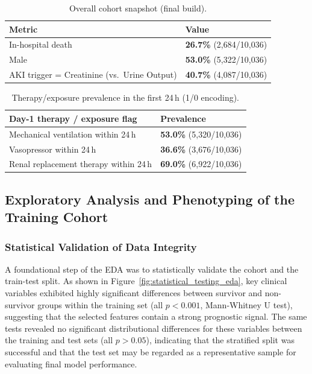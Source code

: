 \begin{table}[htb!]
    \centering
    \caption{Overall cohort snapshot (final build).}
    \label{tab:snapshot}
    \small
    \begin{tabular}{ll}
        \toprule
        \textbf{Metric} & \textbf{Value}\\
        \midrule
        In-hospital death & \textbf{26.7\%} (2,684/10,036)\\
        Male & \textbf{53.0\%} (5,322/10,036)\\
        AKI trigger = Creatinine (vs.\ Urine Output) & \textbf{40.7\%} (4,087/10,036)\\
        \bottomrule
    \end{tabular}
\end{table}

\begin{table}[htb!]
    \centering
    \caption{Therapy/exposure prevalence in the first 24\,h (1/0 encoding).}
    \label{tab:therapies-prev}
    \small
    \begin{tabular}{ll}
        \toprule
        \textbf{Day-1 therapy / exposure flag} & \textbf{Prevalence} \\
        \midrule
        Mechanical ventilation within 24\,h & \textbf{53.0\%} (5,320/10,036) \\
        Vasopressor within 24\,h & \textbf{36.6\%} (3,676/10,036) \\
        Renal replacement therapy within 24\,h & \textbf{69.0\%} (6,922/10,036) \\
        \bottomrule
    \end{tabular}
\end{table}

\subsection{Exploratory Analysis and Phenotyping of the Training Cohort}

\subsubsection{Statistical Validation of Data Integrity}
A foundational step of the EDA was to statistically validate the cohort and the train-test split. As shown in Figure~\ref{fig:statistical_testing_eda}, key clinical variables exhibited highly significant differences between survivor and non-survivor groups within the training set (all $p < 0.001$, Mann-Whitney U test), suggesting that the selected features contain a strong prognostic signal. The same tests revealed no significant distributional differences for these variables between the training and test sets (all $p > 0.05$), indicating that the stratified split was successful and that the test set may be regarded as a representative sample for evaluating final model performance.

